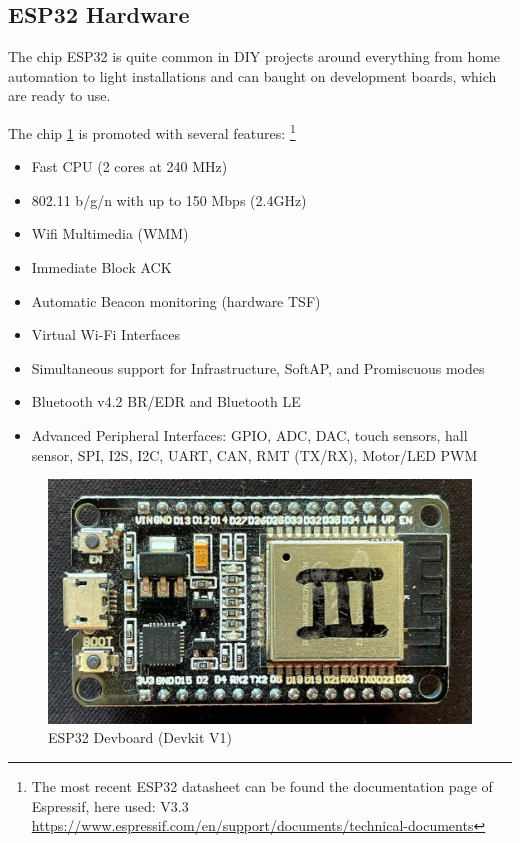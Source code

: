 \subsection*{ESP32 Hardware}

The chip ESP32 is quite common in DIY projects around everything from home automation to light installations 
and can baught on development boards, which are ready to use.

The chip \ref{fig:esp32} is promoted with several features: 
\footnote{The most recent ESP32 datasheet can be found the documentation page of Espressif, here used: V3.3\\
	\url{https://www.espressif.com/en/support/documents/technical-documents}}
\begin{itemize}
	\setlength\itemsep{-0.0em}
	\item Fast CPU (2 cores at 240 MHz)
	\item 802.11 b/g/n with up to 150 Mbps (2.4GHz)
	\item Wifi Multimedia (WMM)
	\item Immediate Block ACK
	\item Automatic Beacon monitoring (hardware TSF)
	\item Virtual Wi-Fi Interfaces
	\item Simultaneous support for Infrastructure, SoftAP, and Promiscuous modes
	\item Bluetooth v4.2 BR/EDR and Bluetooth LE
	\item Advanced Peripheral Interfaces: GPIO, ADC, DAC, touch sensors, hall sensor, 
	SPI, I2S, I2C, UART, CAN, RMT (TX/RX), Motor/LED PWM 
\end{itemize}

\begin{figure}[h]
	\centering
	\includegraphics[scale=0.2]{figures/espdevboard.jpg}
	\caption{ESP32 Devboard (Devkit V1)}
	\label{fig:esp32}%
\end{figure}

